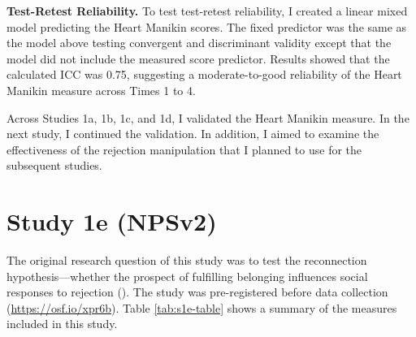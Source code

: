\documentclass[
]{udthesis}
\begin{document}
\textbf{Test-Retest Reliability.} To test test-retest reliability, I created
a linear mixed model predicting the Heart Manikin scores. The fixed
predictor was the same as the model above testing convergent and
discriminant validity except that the model did not include the measured
score predictor. Results showed that the calculated ICC was
0.75, suggesting a
moderate-to-good reliability of the Heart Manikin measure across Times 1
to 4.

Across Studies 1a, 1b, 1c, and 1d, I validated the Heart Manikin
measure. In the next study, I continued the validation. In addition, I
aimed to examine the effectiveness of the rejection manipulation that I
planned to use for the subsequent studies.

\section{Study 1e (NPSv2)}\label{study-1e-npsv2}

The original research question of this study was to test the
reconnection hypothesis---whether the prospect of fulfilling belonging
influences social responses to rejection (). The study was
pre-registered before data collection (\url{https://osf.io/xpr6b}). Table
\ref{tab:s1e-table} shows a summary of the measures included in this
study.
\end{document}

